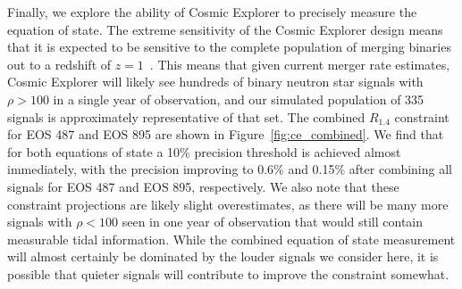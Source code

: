 Finally, we explore the ability of Cosmic Explorer to precisely measure the equation of state. The extreme sensitivity of the Cosmic Explorer design means that it is expected to be sensitive to the complete population of merging binaries out to a redshift of $z=1$~\cite{CEHS}. This means that given current merger rate estimates, Cosmic Explorer will likely see hundreds of binary neutron star signals with $\rho>100$ in a single year of observation, and our simulated population of 335 signals is approximately representative of that set. The combined $R_{1.4}$ constraint for EOS 487 and EOS 895 are shown in Figure~\ref{fig:ce_combined}. We find that for both equations of state a 10\% precision threshold is achieved almost immediately, with the precision improving to 0.6\% and 0.15\% after combining all signals for EOS 487 and EOS 895, respectively. We also note that these constraint projections are likely slight overestimates, as there will be many more signals with $\rho<100$ seen in one year of observation that would still contain measurable tidal information. While the combined equation of state measurement will almost certainly be dominated by the louder signals we consider here, it is possible that quieter signals will contribute to improve the constraint somewhat.

